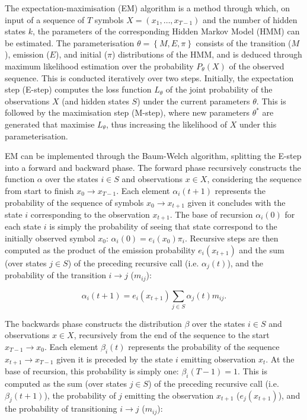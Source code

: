 \documentclass[a4paper, 11pt]{article}
\begin{document}
	The expectation-maximisation (EM) algorithm is a method through which, on input of a sequence of $T$ symbols $X = \left(x_{1}, …, x_{T-1}\right)$ and the number of hidden states $k$, the parameters of the corresponding Hidden Markov Model (HMM) can be estimated. The parameterisation $\theta = \left\{M, E, \pi \right\}$ consists of the transition ($M$), emission ($E$), and initial ($\pi$) distributions of the HMM, and is deduced through maximum likelihood estimation over the probability $P_{\theta} \left(X \right)$ of the observed sequence. This is conducted iteratively over two steps. Initially, the expectation step (E-step) computes the loss function $L_{\theta}$ of the joint probability of the observations $X$ (and hidden states $S$) under the current parameters $\theta$. This is followed by the maximisation step (M-step), where new parameters $\theta^{*}$ are generated that maximise $L_{\theta}$, thus increasing the likelihood of $X$ under this parameterisation.

	EM can be implemented through the Baum-Welch algorithm, splitting the E-step into a forward and backward phase. The forward phase recursively constructs the function $\alpha$ over the states $i \in S$ and observations $x \in X$, considering the sequence from start to finish $x_{0} \to x_{T-1}$. Each element $\alpha_{i} \left(t+1 \right)$ represents the probability of the sequence of symbols $x_{0} \to x_{t+1}$ given it concludes with the state $i$ corresponding to the observation $x_{t+1}$. The base of recursion $\alpha_{i} \left(0 \right)$ for each state $i$ is simply the probability of seeing that state correspond to the initially observed symbol $x_{0}$: $\alpha_{i} \left(0 \right) =  e_{i} \left(x_{0} \right) \pi_{i}$. Recursive steps are then computed as the product of the emission probability $e_{i} \left(x_{t+1} \right)$ and the sum (over states $j \in S$) of the preceding recursive call (i.e. $\alpha_{j} \left(t \right)$), and the probability of the transition $i \to j$ ($m_{ij}$):

	\begin{equation}
		\alpha_{i} \left(t+1 \right) = e_{i} \left(x_{t+1} \right) \sum_{j \in S} \alpha_{j} \left(t \right) m_{ij}			\text{.}
		\label{eq:alpha}
	\end{equation}

	The backwards phase constructs the distribution $\beta$ over the states $i \in S$ and observations $x \in X$, recursively from the end of the sequence to the start $x_{T-1} \to x_{0}$. Each element $\beta_{i} \left(t \right)$ represents the probability of the sequence $x_{t+1} \to x_{T-1}$ given it is preceded by the state $i$ emitting observation $x_{t}$. At the base of recursion, this probability is simply one: $\beta_{i} \left(T-1 \right) = 1$. This is computed as the sum (over states $j \in S$) of the preceding recursive call (i.e. $\beta_{j} \left(t+1 \right)$), the probability of $j$ emitting the observation $x_{t+1}$ ($e_{j} \left(x_{t+1} \right)$), and the probability of transitioning $i \to j$ ($m_{ij}$):
\end{document}

